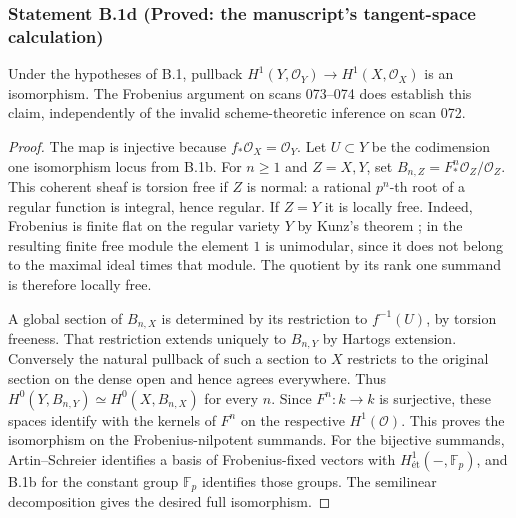 \subsubsection*{Statement B.1d (Proved: the manuscript's tangent-space calculation)}
Under the hypotheses of B.1, pullback
$H^1(Y,\mathcal O_Y)\to H^1(X,\mathcal O_X)$ is an isomorphism.
The Frobenius argument on scans 073--074 does establish this
claim, independently of the invalid scheme-theoretic inference
on scan 072.
\begin{proof}
The map is injective because $f_*\mathcal O_X=\mathcal O_Y$.
Let $U\subset Y$ be the codimension one isomorphism locus from
B.1b.  For $n\geq1$ and $Z=X,Y$, set
$B_{n,Z}=F^n_*\mathcal O_Z/\mathcal O_Z$.  This coherent sheaf
is torsion free if $Z$ is normal: a rational $p^n$-th root
of a regular function is integral, hence regular.  If $Z=Y$
it is locally free.  Indeed, Frobenius is finite flat on
the regular variety $Y$ by Kunz's theorem
\cite[Tag 0EC0]{StacksB}; in the resulting finite free
module the element $1$ is unimodular, since it does not
belong to the maximal ideal times that module.  The quotient
by its rank one summand is therefore locally free.

A global section of $B_{n,X}$ is determined by its restriction
to $f^{-1}(U)$, by torsion freeness.  That restriction extends
uniquely to $B_{n,Y}$ by Hartogs extension.  Conversely the
natural pullback of such a section to $X$ restricts to the
original section on the dense open and hence agrees everywhere.
Thus $H^0(Y,B_{n,Y})\simeq H^0(X,B_{n,X})$ for every $n$.
Since $F^n:k\to k$ is surjective, these spaces identify with
the kernels of $F^n$ on the respective $H^1(\mathcal O)$.
This proves the isomorphism on the Frobenius-nilpotent summands.
For the bijective summands, Artin--Schreier identifies a basis
of Frobenius-fixed vectors with $H^1_{\text{ét}}
(-,\mathbb F_p)$, and B.1b for the constant group
$\mathbb F_p$ identifies those groups.  The semilinear
decomposition gives the desired full isomorphism.
\end{proof}

